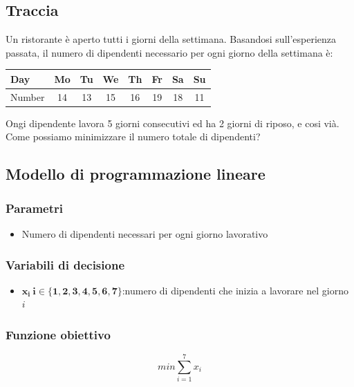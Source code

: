 \subsection{Traccia}
Un ristorante è aperto tutti i giorni della settimana. Basandosi sull'esperienza passata, il numero di dipendenti necessario per ogni giorno della settimana è:

\begin{center}
    \begin{tabular}{|l|*{7}{c|}}
    \hline
    Day & Mo & Tu & We & Th & Fr & Sa & Su \\
    \hline
    Number & 14 & 13 & 15 & 16 & 19 & 18 & 11 \\
    \hline
    \end{tabular}
\end{center}

Ongi dipendente lavora 5 giorni consecutivi ed ha 2 giorni di riposo, e cosi vià. Come possiamo minimizzare il numero totale di dipendenti?

\subsection{Modello di programmazione lineare}

\subsubsection{Parametri}
\begin{itemize}
    \item Numero di dipendenti necessari per ogni giorno lavorativo
\end{itemize}

\subsubsection{Variabili di decisione}
\begin{itemize}
    \item  $\mathbf{x_i \ i \in \{1,2,3,4,5,6,7\}}$:numero di dipendenti che inizia a lavorare nel giorno $i$
\end{itemize}

\subsubsection{Funzione obiettivo}
{
    \Large
    $$
    min \sum_{i=1}^{7} x_i
    $$
}

